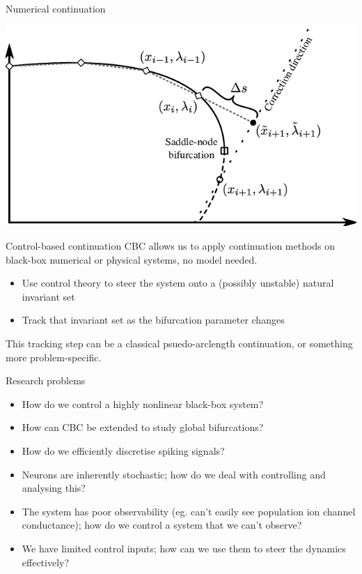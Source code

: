 \documentclass[aspectratio=169]{beamer}
\begin{document}
\begin{frame}[label={sec:org948d6a3}]{Numerical continuation}
\begin{center}
\includegraphics[height=0.8\textheight]{./continuation.png}
\end{center}
\end{frame}

\begin{frame}[label={sec:orgd6fd462}]{Control-based continuation}
CBC allows us to apply continuation methods on black-box numerical or physical systems, no model needed.

\begin{itemize}
\item Use control theory to steer the system onto a (possibly unstable) natural invariant set
\item Track that invariant set as the bifurcation parameter changes
\end{itemize}

This tracking step can be a classical psuedo-arclength continuation, or something more problem-specific.
\end{frame}


\begin{frame}[label={sec:orgcf4b8b7}]{Research problems}
\begin{itemize}[<+->]
\item How do we control a highly nonlinear black-box system?
\item How can CBC be extended to study global bifurcations?
\item How do we efficiently discretise spiking signals?
\item Neurons are inherently stochastic; how do we deal with controlling and analysing this?
\item The system has poor observability (eg. can't easily see population ion channel conductance); how do we control a system that we can't observe?
\item We have limited control inputs; how can we use them to steer the dynamics effectively?
\end{itemize}
\end{frame}
\end{document}
